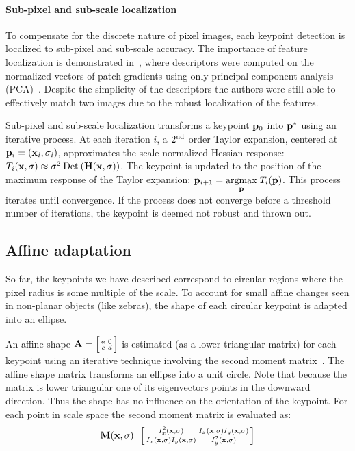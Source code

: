         \paragraph{Sub-pixel and sub-scale localization}
            To compensate for the discrete nature of pixel images, each keypoint detection is localized to
            sub-pixel and sub-scale accuracy. The importance of feature localization is demonstrated
            in~\cite{ke_pca_sift_2004}, where descriptors were computed on the normalized vectors of patch
            gradients using only principal component analysis (PCA)~\cite{jolliffe_principal_2014}. Despite the
            simplicity of the descriptors the authors were still able to effectively match two images due to the
            robust localization of the features.

            Sub-pixel and sub-scale localization transforms a keypoint $\mathbf{p}_0$ into $\mathbf{p}^*$ using an iterative
            process. At each iteration $i$, a $2^{\textrm{nd}}{}$ order Taylor expansion, centered at %
            $\mathbf{p}_i = (\mathbf{x}_i, \sigma_i)$, approximates the scale normalized Hessian response: %
            $T_i(\mathbf{x}, \sigma) \approx \sigma^2 \mathbin{\textrm{Det}}\left(\mathbf{H}(\mathbf{x}, \sigma)\right)$. The keypoint is updated to the position of the
            maximum response of the Taylor expansion: $\mathbf{p}_{i + 1} = \underset{\mathbf{p}}{\operatorname{argmax}}\; T_i(\mathbf{p})$. This process iterates
            until convergence. If the process does not converge before a threshold number of iterations, the
            keypoint is deemed not robust and thrown out.

    \subsection{Affine adaptation}
        So far, the keypoints we have described correspond to circular regions where the pixel radius is some
        multiple of the scale. To account for small affine changes seen in non-planar objects (like zebras), the
        shape of each circular keypoint is adapted into an ellipse.

        An affine shape $\mathbf{A}= \Bigl[ \begin{smallmatrix} a & 0\\c & d \end{smallmatrix} \Bigr] $ is estimated (as a lower triangular matrix) for each keypoint using an
        iterative technique involving the second moment
        matrix~\cite{lindeberg_shape_adapted_1997,baumberg_reliable_2000,mikolajczyk_comparison_2005}. The affine
        shape matrix transforms an ellipse into a unit circle. Note that because the matrix is lower triangular one
        of its eigenvectors points in the downward direction. Thus the shape has no influence on the orientation of
        the keypoint. For each point in scale space the second moment matrix is evaluated as:
        \begin{equation}\label{eqn:secondmoment}
                \mathbf{M}(\mathbf{x}, \sigma) 
                \mkern-6mu=\mkern-6mu 
                 \Bigl[ \begin{smallmatrix}  
                I_x^2(\mathbf{x}, \sigma)      & I_x(\mathbf{x}, \sigma) I_y(\mathbf{x}, \sigma) \\
                I_x(\mathbf{x}, \sigma) I_y(\mathbf{x}, \sigma) & I_y^2(\mathbf{x}, \sigma)  \end{smallmatrix} \Bigr] 
        \end{equation}

